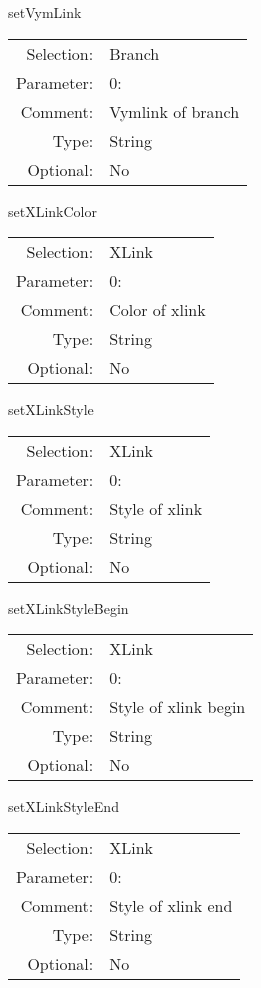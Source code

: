 \item setVymLink\\
\begin{tabular}{rl}
  Selection: & Branch\\
   Parameter: &  0:\\
        Comment: & Vymlink of branch\\
           Type: & String\\
       Optional: &  No\\
\end{tabular}

\item setXLinkColor\\
\begin{tabular}{rl}
  Selection: & XLink\\
   Parameter: &  0:\\
        Comment: & Color of xlink\\
           Type: & String\\
       Optional: &  No\\
\end{tabular}

\item setXLinkStyle\\
\begin{tabular}{rl}
  Selection: & XLink\\
   Parameter: &  0:\\
        Comment: & Style of xlink\\
           Type: & String\\
       Optional: &  No\\
\end{tabular}

\item setXLinkStyleBegin\\
\begin{tabular}{rl}
  Selection: & XLink\\
   Parameter: &  0:\\
        Comment: & Style of xlink begin\\
           Type: & String\\
       Optional: &  No\\
\end{tabular}

\item setXLinkStyleEnd\\
\begin{tabular}{rl}
  Selection: & XLink\\
   Parameter: &  0:\\
        Comment: & Style of xlink end\\
           Type: & String\\
       Optional: &  No\\
\end{tabular}


